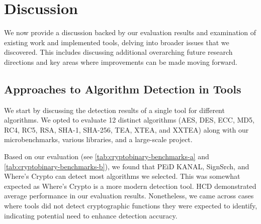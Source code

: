 \section{Discussion}
\label{sec:cryptobinary-discussion}

We now provide a discussion backed by our evaluation results and examination of existing work and implemented tools, delving into broader issues that we discovered.  This includes discussing additional overarching future research directions and key areas where improvements can be made moving forward.



\subsection{Approaches to Algorithm Detection in Tools}

  

We start by discussing the detection results of a single tool for different algorithms. We opted to evaluate 12 distinct algorithms (AES, DES, ECC, MD5, RC4, RC5, RSA, SHA-1, SHA-256, TEA, XTEA, and XXTEA) along with our microbenchmarks, various libraries, and a large-scale project.

Based on our evaluation (see \autoref{tab:cryptobinary-benchmarks-a} and \autoref{tab:cryptobinary-benchmarks-b}), we found that PEiD KANAL, SignSrch, and Where's Crypto can detect most algorithms we selected. This was somewhat expected as Where's Crypto is a more modern detection tool. HCD demonstrated average performance in our evaluation results.
Nonetheless, we came across cases where tools did not detect cryptographic functions they were expected to identify, indicating potential need to enhance detection accuracy.

